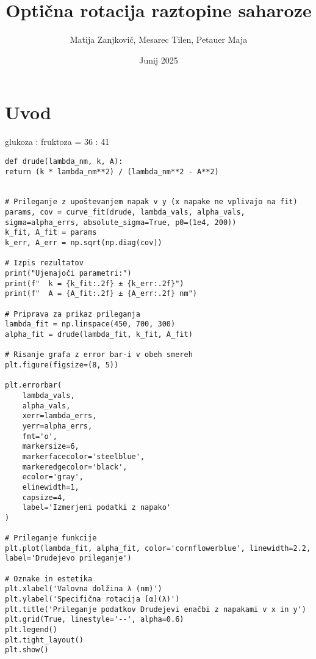 \documentclass[12pt]{extarticle}
\title{Optična rotacija raztopine saharoze}
\author{Matija Zanjkovič, Mesarec Tilen, Petauer Maja}
\date{Junij 2025}
\begin{document}
\maketitle

\section*{Uvod}

glukoza : fruktoza = 36 : 41

\pagebreak

\begin{lstlisting}
def drude(lambda_nm, k, A):
return (k * lambda_nm**2) / (lambda_nm**2 - A**2)


# Prileganje z upoštevanjem napak v y (x napake ne vplivajo na fit)
params, cov = curve_fit(drude, lambda_vals, alpha_vals, sigma=alpha_errs, absolute_sigma=True, p0=(1e4, 200))
k_fit, A_fit = params
k_err, A_err = np.sqrt(np.diag(cov))

# Izpis rezultatov
print("Ujemajoči parametri:")
print(f"  k = {k_fit:.2f} ± {k_err:.2f}")
print(f"  A = {A_fit:.2f} ± {A_err:.2f} nm")

# Priprava za prikaz prileganja
lambda_fit = np.linspace(450, 700, 300)
alpha_fit = drude(lambda_fit, k_fit, A_fit)

# Risanje grafa z error bar-i v obeh smereh
plt.figure(figsize=(8, 5))

plt.errorbar(
    lambda_vals,
    alpha_vals,
    xerr=lambda_errs,
    yerr=alpha_errs,
    fmt='o',
    markersize=6,
    markerfacecolor='steelblue',
    markeredgecolor='black',
    ecolor='gray',
    elinewidth=1,
    capsize=4,
    label='Izmerjeni podatki z napako'
)

# Prileganje funkcije
plt.plot(lambda_fit, alpha_fit, color='cornflowerblue', linewidth=2.2, label='Drudejevo prileganje')

# Oznake in estetika
plt.xlabel('Valovna dolžina λ (nm)')
plt.ylabel('Specifična rotacija [α](λ)')
plt.title('Prileganje podatkov Drudejevi enačbi z napakami v x in y')
plt.grid(True, linestyle='--', alpha=0.6)
plt.legend()
plt.tight_layout()
plt.show()
\end{lstlisting}
\end{document}
